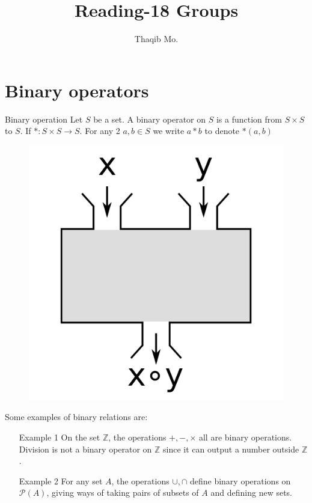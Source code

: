 \documentclass[16pt,a4paper]{article}
\author{Thaqib Mo.}
\title{ Reading-18 Groups }
\theoremstyle{definition}
\begin{document}
\maketitle
\newpage




\section{Binary operators}

\begin{defn}{Binary operation}{}
Let $S$ be a set. A binary operator on $S$ is a function from $S\times S$ to $S$. If $*: S\times S \rightarrow S$. For any 2 $a,b\in S$ we write $a*b$ to denote $*(a,b)$
\end{defn}
\begin{figure}[hbtp]
\centering
\includegraphics[scale=0.1]{figs/fig1.png}
\end{figure}

Some examples of binary relations are:

\begin{itemize}

\item[Example 1] On the set $\mathbb{Z}$, the operations $+,-,\times$ all are binary operations. Division is not a binary operator on $\mathbb{Z}$ since it can output a number outside $\mathbb{Z}$. 

\item[Example 2] For any set $A$, the operations $\cup, \cap$ define binary operations on $\mathcal{P}(A)$, giving ways of taking pairs of subsets of $A$ and defining new sets.  


\end{itemize}
\end{document}
